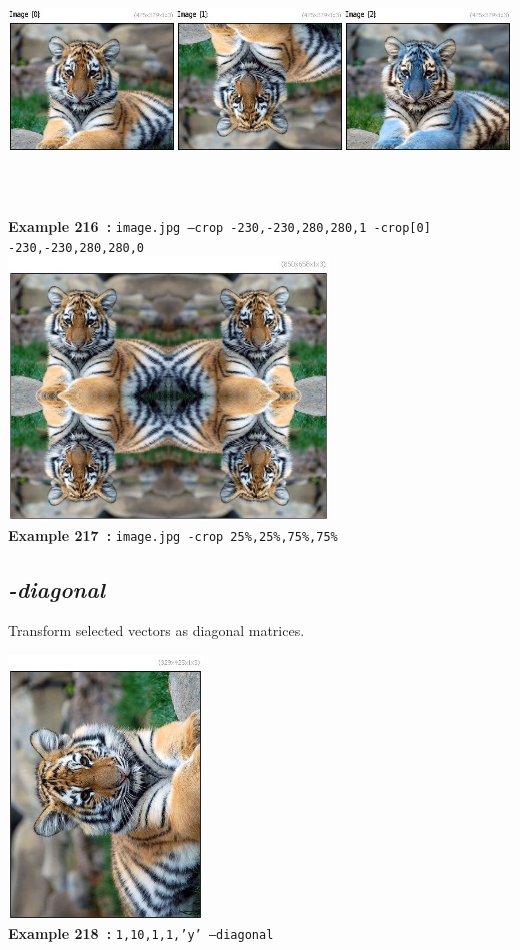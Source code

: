 \documentclass[a4paper,11pt,twoside]{book}
\begin{document}
\begin{center}\includegraphics[keepaspectratio=true,height=7cm,width=\textwidth]{img/gmic_def216.jpg}\\
{\footnotesize \textbf{Example 216~:} \texttt{image.jpg --crop -230,-230,280,280,1 -crop[0] -230,-230,280,280,0}}
\\\includegraphics[keepaspectratio=true,height=7cm,width=\textwidth]{img/gmic_def217.jpg}\\
{\footnotesize \textbf{Example 217~:} \texttt{image.jpg -crop 25\%,25\%,75\%,75\%}}
\end{center}

\subsection{\emph{-diagonal} }\vspace*{-0.5em}
Transform selected vectors as diagonal matrices.
\begin{center}\includegraphics[keepaspectratio=true,height=7cm,width=\textwidth]{img/gmic_def218.jpg}\\
{\footnotesize \textbf{Example 218~:} \texttt{1,10,1,1,'y' --diagonal}}
\end{center}
\end{document}
